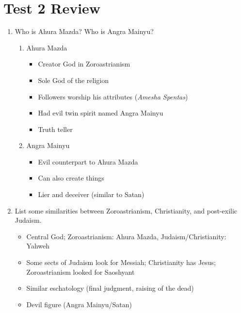 \documentclass[8pt]{article}
\begin{document}
\section*{Test 2 Review}
\begin{enumerate}
    \item Who is Ahura Mazda? Who is Angra Mainyu?
    \begin{enumerate}
        \item Ahura Mazda
        \begin{itemize}
            \item Creator God in Zoroastrianism
            \item Sole God of the religion
            \item Followers worship his attributes (\textit{Amesha Spentas})
            \item Had evil twin spirit named Angra Mainyu
            \item Truth teller
        \end{itemize}
        \item Angra Mainyu
        \begin{itemize}
            \item Evil counterpart to Ahura Mazda
            \item Can also create things
            \item Lier and deceiver (similar to Satan)
        \end{itemize}
    \end{enumerate}

    \item List some similarities between Zoroastrianism, Christianity, and post-exilic Judaism.
    \begin{itemize}
        \item Central God; Zoroastrianism: Ahura Mazda, Judaism/Christianity: Yahweh
        \item Some sects of Judaism look for Messiah; Christianity has Jesus; Zoroastrianism looked for Saoshyant\
        \item Similar eschatology (final judgment, raising of the dead)
        \item Devil figure (Angra Mainyu/Satan)
    \end{itemize}


\end{enumerate}
\end{document}
